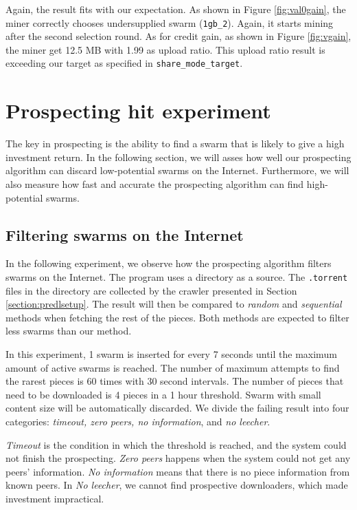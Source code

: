 Again, the result fits with our expectation. As shown in Figure \ref{fig:val0gain}, the miner correctly chooses undersupplied swarm (\texttt{1gb\_2}). Again, it starts mining after the second selection round. As for credit gain, as shown in Figure \ref{fig:vgain}, the miner get 12.5 MB with 1.99 as upload ratio. This upload ratio result is exceeding our target as specified in \texttt{share\_mode\_target}. 

\section{Prospecting hit experiment}
\label{section:prospectexp}
The key in prospecting is the ability to find a swarm that is likely to give a high investment return. In the following section, we will asses how well our prospecting algorithm can discard low-potential swarms on the Internet. Furthermore, we will also measure how fast and accurate the prospecting algorithm can find high-potential swarms. 

\subsection{Filtering swarms on the Internet}
In the following experiment, we observe how the prospecting algorithm filters swarms on the Internet. The program uses a directory as a source. The \texttt{.torrent} files in the directory are collected by the crawler presented in Section \ref{section:predlsetup}. The result will then be compared to \textit{random} and \textit{sequential} methods when fetching the rest of the pieces. Both methods are expected to filter less swarms than our method.


In this experiment, 1 swarm is inserted for every 7 seconds until the maximum amount of active swarms is reached. The number of maximum attempts to find the rarest pieces is 60 times with 30 second intervals. The number of pieces that need to be downloaded is 4 pieces in a 1 hour threshold. Swarm with small content size will be automatically discarded. We divide the failing result into four categories: \textit{timeout, zero peers, no information}, and \textit{no leecher}.

\textit{Timeout} is the condition in which the threshold is reached, and the system could not finish the prospecting. \textit{Zero peers} happens when the system could not get any peers' information. \textit{No information} means that there is no piece information from known peers. In \textit{No leecher}, we cannot find prospective downloaders, which made investment impractical. 

